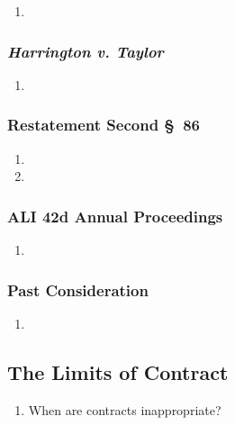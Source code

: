 \begin{enumerate}
    \item %
\end{enumerate}

\subsubsection{\emph{Harrington v. Taylor}}

\begin{enumerate}
    \item %
\end{enumerate}

\subsubsection{Restatement Second \S\ 86}

\begin{enumerate}
    \item %
    \item %
\end{enumerate}

\subsubsection{ALI 42d Annual Proceedings}

\begin{enumerate}
    \item %
\end{enumerate}

\subsubsection{Past Consideration}

\begin{enumerate}
    \item %
\end{enumerate}

\subsection{The Limits of Contract}

\begin{enumerate}
    \item When are contracts inappropriate?
\end{enumerate}

